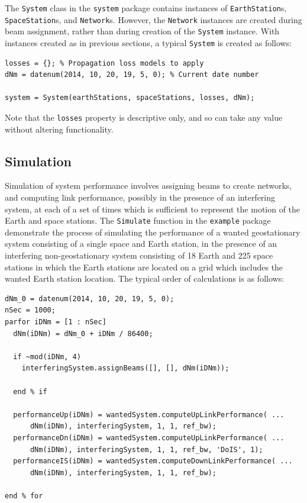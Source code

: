 \documentclass[11pt]{article}
\begin{document}
The \texttt{\small System} class in the \texttt{\small system} package
contains instances of \texttt{\small EarthStation}s, \texttt{\small
  SpaceStation}s, and \texttt{\small Network}s. However, the
\texttt{\small Network} instances are created during beam assignment,
rather than during creation of the \texttt{\small System}
instance. With instances created as in previous sections, a typical
\texttt{\small System} is created as follows:
{\small
\begin{verbatim}
losses = {}; % Propagation loss models to apply
dNm = datenum(2014, 10, 20, 19, 5, 0); % Current date number

system = System(earthStations, spaceStations, losses, dNm);
\end{verbatim}
}
\noindent Note that the \texttt{\small losses} property is descriptive
only, and so can take any value without altering functionality.

\subsection{Simulation}

Simulation of system performance involves assigning beams to create
networks, and computing link performance, possibly in the presence of
an interfering system, at each of a set of times which is sufficient
to represent the motion of the Earth and space stations. The
\texttt{\small Simulate} function in the \texttt{\small example}
package demonstrate the process of simulating the performance of a
wanted geostationary system consisting of a single space and Earth
station, in the presence of an interfering non-geostationary system
consisting of 18 Earth and 225 space stations in which the Earth
stations are located on a grid which includes the wanted Earth station
location. The typical order of calculations is as follows:
{\small
\begin{verbatim}
dNm_0 = datenum(2014, 10, 20, 19, 5, 0);
nSec = 1000;
parfor iDNm = [1 : nSec]
  dNm(iDNm) = dNm_0 + iDNm / 86400;
    
  if ~mod(iDNm, 4)
    interferingSystem.assignBeams([], [], dNm(iDNm));
      
  end % if
    
  performanceUp(iDNm) = wantedSystem.computeUpLinkPerformance( ...
      dNm(iDNm), interferingSystem, 1, 1, ref_bw);
  performanceDn(iDNm) = wantedSystem.computeUpLinkPerformance( ...
      dNm(iDNm), interferingSystem, 1, 1, ref_bw, 'DoIS', 1);
  performanceIS(iDNm) = wantedSystem.computeDownLinkPerformance( ...
      dNm(iDNm), interferingSystem, 1, 1, ref_bw);
   
end % for
\end{verbatim}
}
\end{document}

